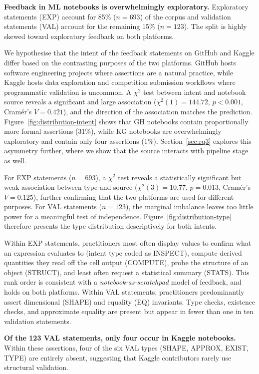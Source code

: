 \documentclass[a4paper,USenglish,cleveref,autoref,thm-restate,anonymous]{lipics-v2021}       %
\begin{document}
\textbf{Feedback in ML notebooks is overwhelmingly exploratory.}
Exploratory statements (EXP) account for 85\% ($n=693$) of the corpus
and validation statements (VAL) account for the remaining 15\% ($n=123$).
The split is highly skewed toward exploratory feedback on both platforms.

We hypothesise that the intent of the feedback statements
on GitHub and Kaggle differ based on the contrasting purposes of the two platforms.
GitHub hosts software engineering projects
where assertions are a natural practice,
while Kaggle hosts data exploration and competition submission workflows
where programmatic validation is uncommon.
A $\chi^2$ test between intent and notebook source
reveals a significant and large association ($\chi^2(1) = 144.72$, $p < 0.001$, Cram\'er's $V = 0.421$),
and the direction of the association matches the prediction.
Figure~\ref{fig:distribution-intent} shows that
GH notebooks contain proportionally more formal assertions (31\%),
while KG notebooks are overwhelmingly exploratory
and contain only four assertions (1\%).
Section~\ref{sec:rq3} explores this asymmetry further,
where we show that the source interacts with pipeline stage as well.

For EXP statements ($n=693$),
a $\chi^2$ test reveals a statistically significant but weak association
between type and source
($\chi^2(3) = 10.77$, $p=0.013$, Cram\'er's $V=0.125$),
further confirming that the two platforms
are used for different purposes.
For VAL statements ($n=123$),
the marginal imbalance leaves too little power for a meaningful test of independence.
Figure~\ref{fig:distribution-type} therefore presents
the type distribution descriptively for both intents.

Within EXP statements,
practitioners most often display values
to confirm what an expression evaluates to (intent type coded as INSPECT),
compute derived quantities they read off the cell output (COMPUTE),
probe the structure of an object (STRUCT),
and least often request a statistical summary (STATS).
This rank order is consistent with a \emph{notebook-as-scratchpad} model of feedback,
and holds on both platforms.
Within VAL statements,
practitioners predominantly assert dimensional (SHAPE) and equality (EQ) invariants.
Type checks, existence checks, and approximate equality are present
but appear in fewer than one in ten validation statements.

\textbf{Of the 123 VAL statements, only four occur in Kaggle notebooks.}
Within these assertions, four of the six VAL types (SHAPE, APPROX, EXIST, TYPE)
are entirely absent,
suggesting that Kaggle contributors rarely use structural validation.
\end{document}
